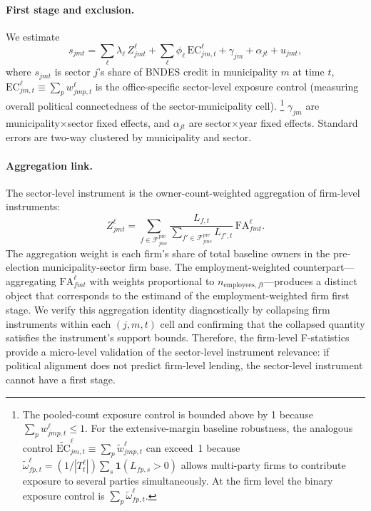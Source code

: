 \documentclass{article}
\newcommand{\FA}{\mathrm{FA}}
\newcommand{\EC}{\mathrm{EC}}
\begin{document}
\paragraph{First stage and exclusion.}
We estimate
\[
  s_{jmt} = \sum_{\ell} \lambda_{\ell}\, Z^{\ell}_{jmt}
  + \sum_{\ell} \phi_\ell\,\EC^\ell_{jm,t} + \gamma_{jm} + \alpha_{jt} + u_{jmt},
\]
where $s_{jmt}$ is sector $j$'s share of BNDES credit in municipality $m$ at time $t$,
$\EC^\ell_{jm,t} \equiv \sum_p w^\ell_{jmp,t}$ is the office-specific sector-level exposure control
(measuring overall political connectedness of the sector-municipality cell).%
\footnote{The pooled-count exposure control is bounded above by 1 because $\sum_p w^\ell_{jmp,t} \leq 1$.
For the extensive-margin baseline robustness, the analogous control
$\widetilde{\EC}^\ell_{jm,t} \equiv \sum_p \widetilde{w}^\ell_{jmp,t}$
can exceed~1 because $\widetilde{\omega}^\ell_{fp,t} = (1/|T^\ell_t|)\sum_s \mathbf{1}(L_{fp,s}>0)$
allows multi-party firms to contribute exposure to several parties simultaneously.
At the firm level the binary exposure control is $\sum_p \widetilde{\omega}^\ell_{fp,t}$.}
$\gamma_{jm}$ are municipality$\times$sector fixed effects,
and $\alpha_{jt}$ are sector$\times$year fixed effects.
Standard errors are two-way clustered by municipality and sector.

\paragraph{Aggregation link.}
The sector-level instrument is the owner-count-weighted aggregation of firm-level instruments:
\[
  Z^{\ell}_{jmt}
  =
  \sum_{f \in \mathcal{F}^{\mathrm{pre}}_{jme}}
  \frac{L_{f,t}}{\sum_{f' \in \mathcal{F}^{\mathrm{pre}}_{jme}} L_{f',t}}\,
  \FA^{\ell}_{fmt}.
\]
The aggregation weight is each firm's share of total baseline owners in the
pre-election municipality-sector firm base.
The employment-weighted counterpart---aggregating $\FA^{\ell}_{fmt}$ with weights
proportional to $n_{\text{employees},ft}$---produces a distinct object that corresponds
to the estimand of the employment-weighted firm first stage.
We verify this aggregation identity diagnostically by collapsing firm instruments
within each $(j,m,t)$ cell and confirming that the collapsed quantity satisfies
the instrument's support bounds.
Therefore, the firm-level F-statistics provide a micro-level validation of the sector-level instrument relevance: if political alignment does not predict firm-level lending, the sector-level instrument cannot have a first stage.
\end{document}

